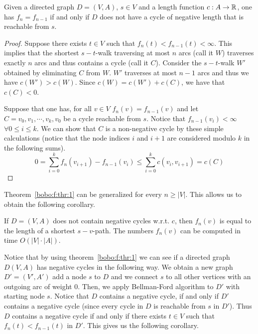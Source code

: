 \begin{theorem}
   \label{bobo:f:thr:1}
   Given a directed graph $D=(V,A)$, $s \in V$ and a length 
   function $c:A \to \mathbb{R}$, one has $f_n = f_{n-1}$ if and only 
   if $D$ does not have a cycle 
   of negative length that is reachable from $s$.
\end{theorem}

\begin{proof}
    Suppose there exists $t \in V$ such that 
   $f_n(t) < f_{n-1}(t) < \infty$. This implies that the shortest 
   $s-t$-walk traversing at most $n$ arcs (call it $W$) traverses 
   exactly $n$ arcs and thus contains a cycle (call it $C$). Consider 
   the $s-t$-walk $W'$ obtained by eliminating $C$ from $W$. 
   $W'$ traverses at most $n-1$ arcs and thus we have $c(W') > c(W)$.
   Since $c(W) = c(W') + c(C)$, we have that $c(C) < 0$.

   Suppose that one has, for all $v ∈ V$ $f_n(v) = f_{n-1}(v)$ and
   let $C = v_0,v_1,\cdots,v_k,v_0$ be a cycle 
   reachable from $s$. Notice that 
   $f_{n-1}(v_i)<\infty$ $\forall 0 \leq i \leq k$. 
   We can show that $C$ is a non-negative cycle by these simple 
   calculations (notice that the node indices $i$ and $i+1$ are 
   considered modulo $k$ in the following sums).
   \begin{displaymath}
      0 = \sum_{i = 0}^k f_n(v_{i+1}) - f_{n-1}(v_i) \leq
      \sum_{i = 0}^k c(v_i,v_{i+1}) = c(C)
   \end{displaymath}
\end{proof}

Theorem~\ref{bobo:f:thr:1} can be generalized for every $n \geq |V|$.
This allows us to obtain the following corollary.

\begin{corollary}
  \label{co:7}
  If $D = (V,A) $ does not contain negative cycles w.r.t. $c$, then
  $f_n(v)$ is equal to the length of a shortest $s-v$-path. The
  numbers $f_n(v)$ can be computed in time $O( |V| \cdot |A| )$. 
\end{corollary}

Notice that by using theorem~\ref{bobo:f:thr:1} 
we can see if a directed graph $D(V,A)$ has negative cycles in the 
following way. We obtain a new graph $D'=(V',A')$ add a node $s$ to 
$D$ and we connect $s$ to all other vertices with an outgoing arc 
of weight $0$. Then, we apply Bellman-Ford algorithm to $D'$ with 
starting node $s$. Notice that $D$ contains a negative cycle, if 
and only if $D'$ contains a negative cycle (since every cycle in $D$ 
is reachable from $s$ in $D'$). Thus $D$ contains a 
negative cycle if and only if there exists $t \in V$ such that 
$f_n(t) < f_{n-1}(t)$ in $D'$.
This gives us the following corollary.

